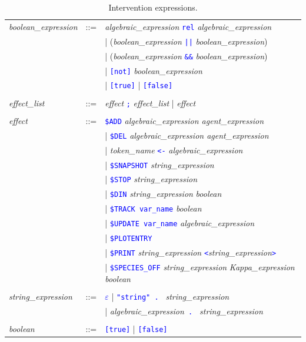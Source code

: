 \documentclass[11pt]{book}
\def\tcb#1{\textcolor{blue}{\ttt{#1}}}
\def\ttt#1{\texttt{#1}}
\def\var#1{{\textquotesingle}#1{\textquotesingle}}
\begin{document}
\begin{table}[htbp]
  \centering
  \caption{Intervention expressions.}
  \begin{tabular}{@{} lcl @{}}
    \textit{boolean\_expression} &::=& \textit{algebraic\_expression}\index{boolean expression} \tcb{rel} \textit{algebraic\_expression} \\
    && | (\textit{boolean\_expression} \tcb{||} \textit{boolean\_expression}) \\
    && | (\textit{boolean\_expression} \tcb{\&\&} \textit{boolean\_expression}) \\
    && | \tcb{[not]} \textit{boolean\_expression} \\
    && | \tcb{[true]} | \tcb{[false]} \\\\
    \textit{effect\_list} &::=& \textit{effect} \tcb{\ttt {;}} \textit{effect\_list} | \textit{effect} \\\\
\textit{effect} &::=& \tcb{\$ADD} \textit{algebraic\_expression agent\_expression} \\
    && | \tcb{\$DEL} \textit{algebraic\_expression agent\_expression} \\
    && | \textit{token\_name} \tcb{<-} \textit{algebraic\_expression} \\
    && | \tcb{\$SNAPSHOT} \textit{string\_expression}\\
    && | \tcb{\$STOP} \textit{string\_expression}\\
	&& | \tcb{\$DIN} \textit{string\_expression} \textit{boolean} \\
    && | \tcb{\$TRACK \var{var\_name}} \textit{boolean} \\
    && | \tcb{\$UPDATE \var{var\_name}} \textit{algebraic\_expression} \\
    && | \tcb{\$PLOTENTRY} \\
    && | \tcb{\$PRINT} \textit{string\_expression} \tcb{<}\textit{string\_expression}\tcb{>} \\
    && | \tcb{\$SPECIES\_OFF} \textit{string\_expression} \textit{Kappa\_expression} \textit{boolean} \\
    \\
    \textit{string\_expression} &::=& \tcb{$\varepsilon$} | \tcb{"string" . } \textit{string\_expression} \\
    && | \textit{algebraic\_expression}\tcb{ . } \textit{string\_expression} \\\\
	\textit{boolean} &::=& \tcb{[true]} | \tcb{[false]}
  \end{tabular}
  \label{tab:pert}
\end{table}
\end{document}
